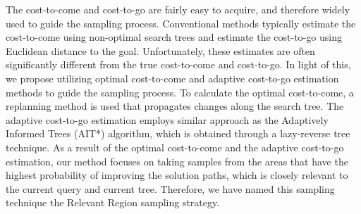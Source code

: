 


The cost-to-come and cost-to-go are fairly easy to acquire, and therefore widely used to guide the sampling process.
Conventional methods typically estimate the cost-to-come using non-optimal search trees and estimate the cost-to-go using Euclidean distance to the goal. 
Unfortunately, these estimates are often significantly different from the true cost-to-come and cost-to-go. 
In light of this, we propose utilizing optimal cost-to-come and adaptive cost-to-go estimation methods to guide the sampling process. 
To calculate the optimal cost-to-come, a replanning method is used that propagates changes along the search tree. 
The adaptive cost-to-go estimation employs similar approach as the Adaptively Informed Trees (AIT*) algorithm, which is obtained through a lazy-reverse tree technique.
As a result of the optimal cost-to-come and the adaptive cost-to-go estimation, our method focuses on taking samples from the areas that have the highest probability of improving the solution paths, which is closely relevant to the current query and current tree. 
Therefore, we have named this sampling technique the Relevant Region sampling strategy.

